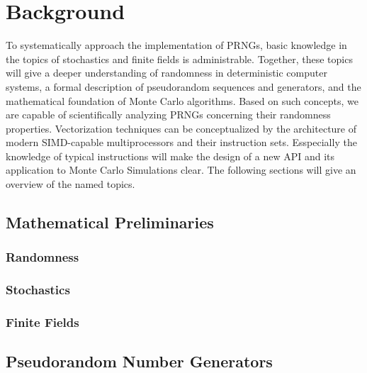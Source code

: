 \documentclass{stdlocal}
\begin{document}
\section{Background} %
\label{sec:background}
  To systematically approach the implementation of PRNGs, basic knowledge in the topics of stochastics and finite fields is administrable.
  Together, these topics will give a deeper understanding of randomness in deterministic computer systems, a formal description of pseudorandom sequences and generators, and the mathematical foundation of Monte Carlo algorithms.
  Based on such concepts, we are capable of scientifically analyzing PRNGs concerning their randomness properties.
  Vectorization techniques can be conceptualized by the architecture of modern SIMD-capable multiprocessors and their instruction sets.
  Esspecially the knowledge of typical instructions will make the design of a new API and its application to Monte Carlo Simulations clear.
  The following sections will give an overview of the named topics.

  \subsection{Mathematical Preliminaries} %
  \label{sub:mathematical_preliminaries}
    \subsubsection*{Randomness} %
    \label{ssub:randomness}


    \subsubsection*{Stochastics} %
    \label{ssub:stochastics}


    \subsubsection*{Finite Fields} %
    \label{ssub:finite_fields}


  \subsection{Pseudorandom Number Generators} %
  \label{sub:pseudorandom_number_generators}
\end{document}
